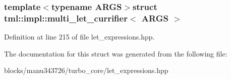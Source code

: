 \subsubsection*{template$<$typename A\+R\+G\+S$>$struct tml\+::impl\+::multi\+\_\+let\+\_\+currifier$<$ A\+R\+G\+S $>$}



Definition at line 215 of file let\+\_\+expressions.\+hpp.



The documentation for this struct was generated from the following file\+:\begin{DoxyCompactItemize}
\item 
blocks/manu343726/turbo\+\_\+core/let\+\_\+expressions.\+hpp\end{DoxyCompactItemize}
